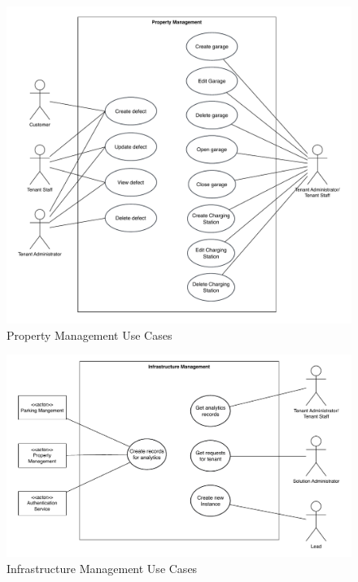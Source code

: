 \begin{figure}[ht]
    \centering
    \includegraphics[width=\textwidth]{resources/prop-ma-use-cases.pdf}
    \caption{Property Management Use Cases}
    \label{fig:prop-ma-use-cases}
\end{figure}

\begin{figure}[ht]
    \centering
    \includegraphics[width=\textwidth]{resources/inf-ma-use-cases.pdf}
    \caption{Infrastructure Management Use Cases}
    \label{fig:inf-ma-use-cases}
\end{figure}

